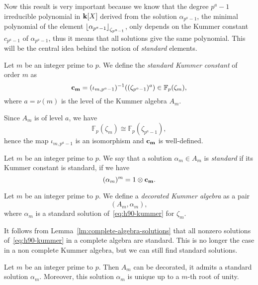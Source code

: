 Now this result is very important because we know that the degree $p^a-1$
irreducible polynomial in $\mathbf{k}[X]$ derived from the solution $\alpha_{p^a-1}$,
\ie the minimal polynomial of the element
$\left\lfloor \alpha_{p^a-1} \right\rfloor_{\zeta_{p^a-1}}$,
only depends on the Kummer constant $c_{p^a-1}$ of $\alpha_{p^a-1}$, thus it
means that all solutions give the same polynomial. This will be the central idea
behind the notion of \emph{standard} elements.
\begin{defi}
  Let $m$ be an integer prime to $p$. We define the \emph{standard Kummer
  constant} of order $m$ as
  \[
    \mathbf{c_{m}} = (\iota_{m,
    p^a-1})^{-1}((\zeta_{p^a-1})^a)\in\mathbb{F}_{p}(\zeta_m),
  \]
  where $a=\nu(m)$ is the level of the Kummer algebra $A_m$.
\end{defi}
\begin{rem}
 Since $A_m$ is of level $a$, we have
 \[
   \mathbb{F}_p(\zeta_m) \cong \mathbb{F}_p(\zeta_{p^a-1}),
 \]
 hence the map $\iota_{m, p^a-1}$ is an isomorphism and $\mathbf{c_{m}}$ is
 well-defined.
\end{rem}
\begin{defi}
  Let $m$ be an integer prime to $p$. We say that a solution $\alpha_m\in A_m$
  is \emph{standard} if its Kummer constant is standard, \ie if we have
  \[
    (\alpha_m)^m = 1\otimes\mathbf{c_{m}}.
  \]
\end{defi}
\begin{defi}
  Let $m$ be an integer prime to $p$. We define a \emph{decorated Kummer
  algebra} as a pair
  \[
    (A_m, \alpha_m),
  \]
  where $\alpha_m$ is a standard solution of~\eqref{eq:h90-kummer} for
  $\zeta_m$.
\end{defi}
It follows from Lemma~\ref{lm:complete-algebra-solutions} that all nonzero
solutions of~\eqref{eq:h90-kummer} in a complete algebra are standard. This is
no longer the case in a non complete Kummer algebra, but we can still find
standard solutions.
\begin{prop}
  \label{prop:decoration}
 Let $m$ be an integer prime to $p$. Then $A_m$ can be decorated, \ie it admits a
 standard solution $\alpha_m$. Moreover, this solution $\alpha_m$ is unique up
 to a $m$-th root of unity. 
\end{prop}
